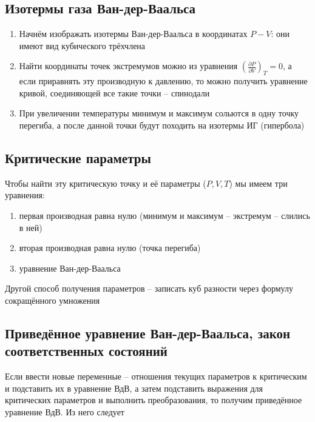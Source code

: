 \documentclass[a4paper, 14pt]{article}
\begin{document}
    \subsection{Изотермы газа Ван-дер-Ваальса}
    
    \begin{enumerate}
        \item Начнём изображать изотермы Ван-дер-Ваальса в координатах $P - V$: они имеют вид кубического трёхчлена
        \item Найти координаты точек экстремумов можно из уравнения $(\frac{\partial P}{\partial V})_T = 0$, а если
        приравнять эту производную к давлению, то можно получить уравнение кривой, соединяющей все такие точки --
        спинодали
        \item При увеличении температуры минимум и максимум сольются в одну точку перегиба, а после данной точки
        будут походить на изотермы ИГ (гипербола)
    \end{enumerate}
    
    \subsection{Критические параметры}
    
    Чтобы найти эту критическую точку и её параметры ($P, V, T$) мы имеем три уравнения:
    
    \begin{enumerate}
        \item первая производная равна нулю (минимум и максимум -- экстремум -- слились в ней)
        \item вторая производная равна нулю (точка перегиба)
        \item уравнение Ван-дер-Ваальса
    \end{enumerate}
    
    Другой способ получения параметров -- записать куб разности через формулу сокращённого умножения
    
    \subsection{Приведённое уравнение Ван-дер-Ваальса, закон соответственных состояний}
    
    Если ввести новые переменные -- отношения текущих параметров к критическим и подставить их в уравнение ВдВ, а
    затем подставить выражения для критических параметров и выполнить преобразования, то получим приведённое
    уравнение ВдВ.
    Из него следует
    
\end{document}
